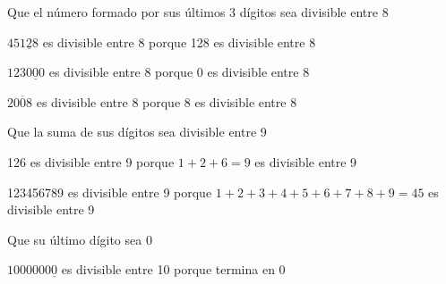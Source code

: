 \documentclass[11pt]{scrartcl}
\begin{document}
\begin{criterio*}
    Que el número formado por sus últimos 3 dígitos sea divisible entre 8
\end{criterio*}
\begin{ejemplo*}
    $45\underline{128}$ es divisible entre 8 porque 128 es divisible entre 8
\end{ejemplo*}
\begin{ejemplo*}
    $123\underline{000}$ es divisible entre 8 porque 0 es divisible entre 8
    \end{ejemplo*}
    \begin{ejemplo*}
    $2\overline{008}$ es divisible entre 8 porque 8 es divisible entre 8
\end{ejemplo*}
\begin{criterio*}
    Que la suma de sus dígitos sea divisible entre 9
\end{criterio*}
\begin{ejemplo*}
    126 es divisible entre 9 porque $1+2+6=9$ es divisible entre 9
\end{ejemplo*}
\begin{ejemplo*}
     123456789 es divisible entre 9 porque $1+2+3+4+5+6+7+8+9=45$ es divisible entre 9
\end{ejemplo*}
\begin{criterio*}
    Que su último dígito sea 0
\end{criterio*}
\begin{ejemplo*}
    $1000000\underline{0}$ es divisible entre 10 porque termina en 0
\end{ejemplo*}
\end{document}
